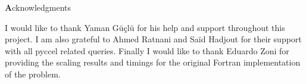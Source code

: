 \clearemptydoublepage
{}
{}

\vspace*{2cm}

\begin{center}
{\Large \textbf Acknowledgments}
\end{center}

\vspace{1cm}

\begin{center}
I would like to thank Yaman G\"u\c{c}l\"u for his help and support throughout this project. I am also grateful to Ahmed Ratnani and Sa\"id Hadjout for their support with all pyccel related queries. Finally I would like to thank Eduardo Zoni for providing the scaling results and timings for the original Fortran implementation of the problem.
\end{center}
